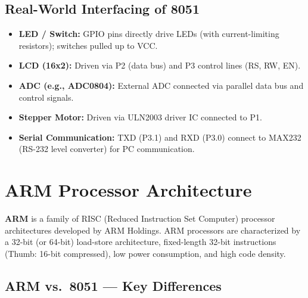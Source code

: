 \documentclass[12pt,a4paper]{article}
\begin{document}
\subsection{Real-World Interfacing of 8051}
\begin{itemize}[leftmargin=*, itemsep=3pt]
  \item \textbf{LED / Switch:} GPIO pins directly drive LEDs (with current-limiting resistors); switches pulled up to VCC.
  \item \textbf{LCD (16x2):} Driven via P2 (data bus) and P3 control lines (RS, RW, EN).
  \item \textbf{ADC (e.g., ADC0804):} External ADC connected via parallel data bus and control signals.
  \item \textbf{Stepper Motor:} Driven via ULN2003 driver IC connected to P1.
  \item \textbf{Serial Communication:} TXD (P3.1) and RXD (P3.0) connect to MAX232 (RS-232 level converter) for PC communication.
\end{itemize}

\section{ARM Processor Architecture}

\begin{tcolorbox}[defbox, title={\textbf{ARM (Advanced RISC Machine) Processor}}]
\textbf{ARM} is a family of RISC (Reduced Instruction Set Computer) processor architectures developed by ARM Holdings. ARM processors are characterized by a 32-bit (or 64-bit) load-store architecture, fixed-length 32-bit instructions (Thumb: 16-bit compressed), low power consumption, and high code density.
\end{tcolorbox}

\subsection{ARM vs.\ 8051 --- Key Differences}
\end{document}
